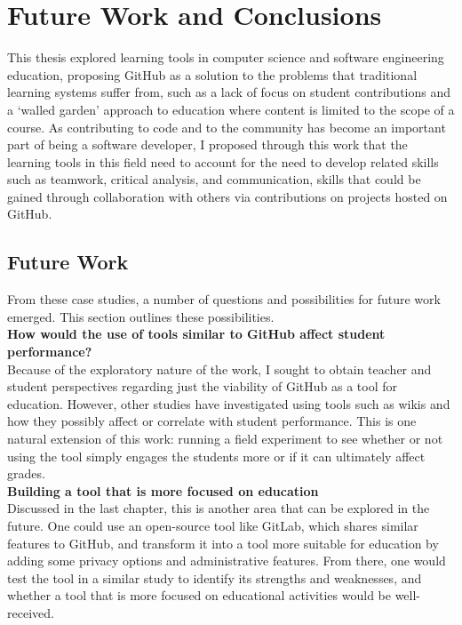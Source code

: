 \chapter{Future Work and Conclusions}

This thesis explored learning tools in computer science and software engineering education, proposing GitHub as a solution to the problems that traditional learning systems suffer from, such as a lack of focus on student contributions and a `walled garden' approach to education where content is limited to the scope of a course. As contributing to code and to the community has become an important part of being a software developer, I proposed through this work that the learning tools in this field need to account for the need to develop related skills such as teamwork, critical analysis, and communication, skills that could be gained through collaboration with others via contributions on projects hosted on GitHub.

\section{Future Work}
From these case studies, a number of questions and possibilities for future work emerged. This section outlines these possibilities. \\

\textbf{How would the use of tools similar to GitHub affect student performance?} \\
Because of the exploratory nature of the work, I sought to obtain teacher and student perspectives regarding just the viability of GitHub as a tool for education. However, other studies have investigated using tools such as wikis \cite{minocha2007collaborative} and how they possibly affect or correlate with student performance. This is one natural extension of this work: running a field experiment to see whether or not using the tool simply engages the students more or if it can ultimately affect grades. \\

\textbf{Building a tool that is more focused on education} \\
Discussed in the last chapter, this is another area that can be explored in the future. One could use an open-source tool like GitLab, which shares similar features to GitHub, and transform it into a tool more suitable for education by adding some privacy options and administrative features. From there, one would test the tool in a similar study to identify its strengths and weaknesses, and whether a tool that is more focused on educational activities would be well-received. \\

